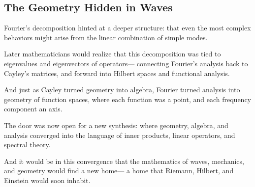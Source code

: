 \subsection*{The Geometry Hidden in Waves}

Fourier’s decomposition hinted at a deeper structure:  
that even the most complex behaviors might arise from the linear combination of simple modes.

Later mathematicians would realize that this decomposition was tied to eigenvalues and eigenvectors of operators—  
connecting Fourier’s analysis back to Cayley’s matrices, and forward into Hilbert spaces and functional analysis.

And just as Cayley turned geometry into algebra,  
Fourier turned analysis into geometry of function spaces,  
where each function was a point, and each frequency component an axis.

The door was now open for a new synthesis:  
where geometry, algebra, and analysis converged into the language of inner products, linear operators, and spectral theory.

And it would be in this convergence that the mathematics of waves, mechanics, and geometry would find a new home—  
a home that Riemann, Hilbert, and Einstein would soon inhabit.
